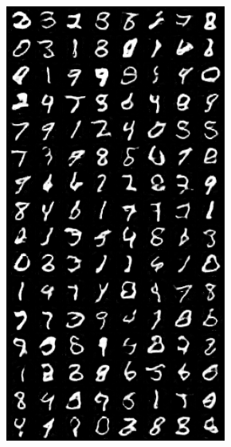 \begin{figure}[H]
    \begin{subfigure}{0.2\textwidth}
        \centering
        \includegraphics[width=0.95\linewidth]{ngf/128/fake_sample_epoch_0010.png}
        \caption{}
        \label{subfig:ngf/128/fake_sample_epoch_0010}
    \end{subfigure}%
    \begin{subfigure}{0.2\textwidth}

\end{subfigure}
\end{figure}
